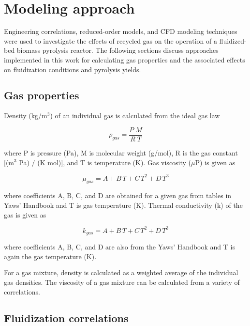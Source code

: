 
\section{Modeling approach}

Engineering correlations, reduced-order models, and CFD modeling techniques were used to investigate the effects of recycled gas on the operation of a fluidized-bed biomass pyrolysis reactor. The following sections discuss approaches implemented in this work for calculating gas properties and the associated effects on fluidization conditions and pyrolysis yields.

\subsection{Gas properties}

Density (kg/m$^3$) of an individual gas is calculated from the ideal gas law

\begin{equation}
    \rho_{gas} = \frac{P\;M}{R\;T}
\end{equation}

\noindent where P is pressure (Pa), M is molecular weight (g/mol), R is the gas constant [(m$^3$ Pa) / (K mol)], and T is temperature (K). Gas viscosity ($\mu$P) is given as

\begin{equation}
    \mu_{gas} = A + B\,T + C\,T^2 + D\,T^3
\end{equation}

\noindent where coefficients A, B, C, and D are obtained for a given gas from tables in Yaws' Handbook and T is gas temperature (K). Thermal conductivity (k) of the gas is given as

\begin{equation}
    k_{gas} = A + B\,T + C\,T^2 + D\,T^3
\end{equation}

\noindent where coefficients A, B, C, and D are also from the Yaws' Handbook and T is again the gas temperature (K).

For a gas mixture, density is calculated as a weighted average of the individual gas densities. The viscosity of a gas mixture can be calculated from a variety of correlations.

\subsection{Fluidization correlations}

